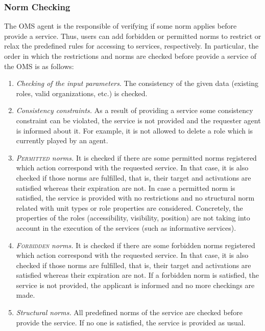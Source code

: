 \subsubsection{Norm Checking}

The OMS agent is the responsible of verifying if some norm applies before provide a service. Thus, users can add forbidden or permitted norms to restrict or relax the predefined rules for accessing to services,  respectively. In particular, the order in which the restrictions and norms are checked before provide a service of the OMS is as follows: 
\begin{enumerate}
\item \textit{Checking of the input parameters}. The consistency of the given data (existing roles, valid organizations, etc.) is checked.

\item \textit{Consistency constraints.} As a result of providing a service some consistency constraint can be  violated, the service is not provided and the requester agent is informed about it. For example, it is not allowed to delete a role which is currently played by an agent.

\item \textit{\textsc{Permitted} norms.} It is checked if there are some permitted norms registered which action correspond with the requested service. In that case, it is also checked if those norms are fulfilled, that is, their target and activations are satisfied whereas their expiration are not. In case a permitted norm is satisfied, the service is provided with no restrictions and  no structural norm related with unit types or role properties are considered. Concretely, the properties of the roles (accessibility, visibility, position) are not taking into account in the execution of the services (such as informative services).

\item \textit{\textsc{Forbidden} norms.}  It is checked if there are some forbidden norms registered which action correspond with the requested service. In that case, it is also checked if those norms are fulfilled, that is, their target and activations are satisfied whereas their expiration are not. If a forbidden norm is satisfied, the service is not provided, the applicant is informed and no more checkings are made. 

\item \textit{Structural norms.} All predefined norms of the service are checked before provide the service. If no one is satisfied, the service is provided as usual.


\end{enumerate}
